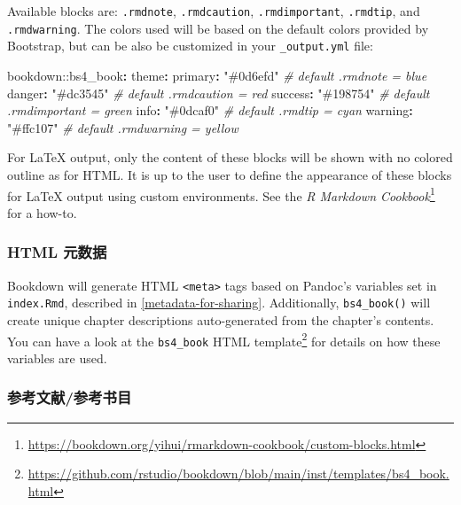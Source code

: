 \documentclass[
  12pt,
]{krantz}
\newenvironment{Shaded}{\begin{snugshade}}{\end{snugshade}}
\newcommand{\AttributeTok}[1]{\textcolor[rgb]{0.77,0.63,0.00}{#1}}
\newcommand{\CommentTok}[1]{\textcolor[rgb]{0.56,0.35,0.01}{\textit{#1}}}
\newcommand{\FunctionTok}[1]{\textcolor[rgb]{0.00,0.00,0.00}{#1}}
\newcommand{\KeywordTok}[1]{\textcolor[rgb]{0.13,0.29,0.53}{\textbf{#1}}}
\newcommand{\StringTok}[1]{\textcolor[rgb]{0.31,0.60,0.02}{#1}}
\renewcommand{\href}[2]{#2\footnote{\url{#1}}}
\theoremstyle{definition}
\theoremstyle{definition}
\theoremstyle{definition}
\theoremstyle{definition}
\theoremstyle{remark}
\begin{document}
Available blocks are: \texttt{.rmdnote}, \texttt{.rmdcaution}, \texttt{.rmdimportant}, \texttt{.rmdtip}, and \texttt{.rmdwarning}. The colors used will be based on the default colors provided by Bootstrap, but can be also be customized in your \texttt{\_output.yml} file:

\begin{Shaded}
\begin{Highlighting}[]
\AttributeTok{bookdown:}\FunctionTok{:bs4\_book}\KeywordTok{:}
\AttributeTok{  }\FunctionTok{theme}\KeywordTok{:}
\AttributeTok{    }\FunctionTok{primary}\KeywordTok{:}\AttributeTok{ }\StringTok{"\#0d6efd"}\CommentTok{   \# default .rmdnote = blue}
\AttributeTok{    }\FunctionTok{danger}\KeywordTok{:}\AttributeTok{  }\StringTok{"\#dc3545"}\CommentTok{   \# default .rmdcaution = red}
\AttributeTok{    }\FunctionTok{success}\KeywordTok{:}\AttributeTok{ }\StringTok{"\#198754"}\CommentTok{   \# default .rmdimportant = green}
\AttributeTok{    }\FunctionTok{info}\KeywordTok{:}\AttributeTok{    }\StringTok{"\#0dcaf0"}\CommentTok{   \# default .rmdtip = cyan}
\AttributeTok{    }\FunctionTok{warning}\KeywordTok{:}\AttributeTok{ }\StringTok{"\#ffc107"}\CommentTok{   \# default .rmdwarning = yellow}
\end{Highlighting}
\end{Shaded}

For LaTeX output, only the content of these blocks will be shown with no colored outline as for HTML. It is up to the user to define the appearance of these blocks for LaTeX output using custom environments. See the \href{https://bookdown.org/yihui/rmarkdown-cookbook/custom-blocks.html}{\emph{R Markdown Cookbook}} for a how-to.

\hypertarget{html-ux5143ux6570ux636e}{%
\subsubsection{HTML 元数据}\label{html-ux5143ux6570ux636e}}

Bookdown will generate HTML \texttt{\textless{}meta\textgreater{}} tags based on Pandoc's variables set in \texttt{index.Rmd}, described in \ref{metadata-for-sharing}. Additionally, \texttt{bs4\_book()} will create unique chapter descriptions auto-generated from the chapter's contents. You can have a look at \href{https://github.com/rstudio/bookdown/blob/main/inst/templates/bs4_book.html}{the \texttt{bs4\_book} HTML
template} for details on how these variables are used.

\hypertarget{ux53c2ux8003ux6587ux732eux53c2ux8003ux4e66ux76ee}{%
\subsubsection{参考文献/参考书目}\label{ux53c2ux8003ux6587ux732eux53c2ux8003ux4e66ux76ee}}
\end{document}
